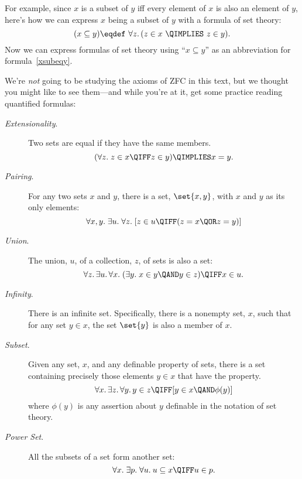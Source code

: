 For example, since $x$ is a subset of $y$ iff every element of $x$ is
also an element of $y$, here's how we can express $x$ being a subset
of $y$ with a formula of set theory:
\begin{equation}\label{xsubeqy}
(x \subseteq y) \eqdef\ \forall z.\, (z \in x\ \QIMPLIES\ z \in y).
\end{equation}
Now we can express formulas of set theory using ``$x \subseteq y$'' as
an abbreviation for formula~\eqref{xsubeqy}.

We're \emph{not} going to be studying the axioms of ZFC in this text,
but we thought you might like to see them---and while you're at it,
get some practice reading quantified formulas: 

\begin{description}

\item[\emph{Extensionality}.]
  Two sets are equal if they have the same members.
\[
(\forall z.\; z \in x \QIFF z \in y) \QIMPLIES x = y.
\]

\item[\emph{Pairing}.] For
  any two sets $x$ and $y$, there is a set, $\set{x,y}$, with $x$ and
  $y$ as its only elements:
\[
\forall x,y.\; \exists u.\; \forall z.\;
[z \in u \QIFF (z = x \QOR z = y)]
\]

\item[\emph{Union}.]  The union,
  $u$, of a collection, $z$, of sets is also a set:
\[
\forall z.\, \exists u.\, \forall x.\; (\exists y.\; x \in y \QAND y
\in z) \QIFF x \in u.
\]

\item[\emph{Infinity}.]  There
  is an infinite set.  Specifically, there is a nonempty set, $x$,
  such that for any set $y \in x$, the set $\set{y}$ is also a member
  of $x$.

\item[\emph{Subset}.] Given any
  set, $x$, and any definable property of sets, there is a set
  containing precisely those elements $y \in x$ that have the
  property.
\[
\forall x.\, \exists z.\, \forall y.\, y \in z \QIFF [y \in x \QAND \phi(y)]
\]
where $\phi(y)$ is any assertion about $y$ definable in the notation
of set theory.

\item[\emph{Power Set}.]  All the
  subsets of a set form another set:
\[
\forall x.\; \exists p.\; \forall u.\: u \subseteq x \QIFF u \in p.
\]


\end{description}
